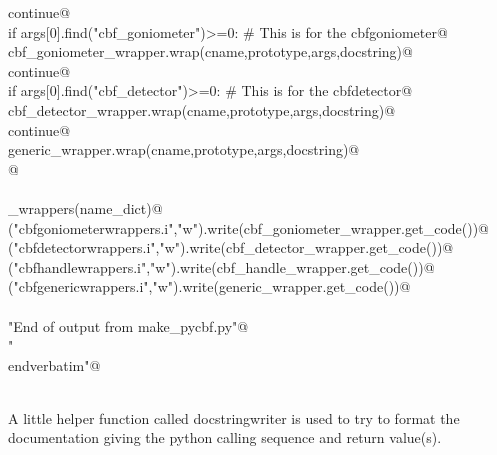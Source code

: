 \documentclass[10pt,a4paper,twoside,notitlepage]{article}
\begin{document}
\begin{flushleft}
\begin{list}{}{}
\mbox{}\verb@         continue@\\
\mbox{}\verb@      if args[0].find("cbf_goniometer")>=0: # This is for the cbfgoniometer@\\
\mbox{}\verb@         cbf_goniometer_wrapper.wrap(cname,prototype,args,docstring)@\\
\mbox{}\verb@         continue@\\
\mbox{}\verb@      if args[0].find("cbf_detector")>=0: # This is for the cbfdetector@\\
\mbox{}\verb@         cbf_detector_wrapper.wrap(cname,prototype,args,docstring)@\\
\mbox{}\verb@         continue@\\
\mbox{}\verb@      generic_wrapper.wrap(cname,prototype,args,docstring)@\\
\mbox{}\verb@ @\\
\mbox{}\verb@@\\
\mbox{}\verb@generate_wrappers(name_dict)@\\
\mbox{}\verb@open("cbfgoniometerwrappers.i","w").write(cbf_goniometer_wrapper.get_code())@\\
\mbox{}\verb@open("cbfdetectorwrappers.i","w").write(cbf_detector_wrapper.get_code())@\\
\mbox{}\verb@open("cbfhandlewrappers.i","w").write(cbf_handle_wrapper.get_code())@\\
\mbox{}\verb@open("cbfgenericwrappers.i","w").write(generic_wrapper.get_code())@\\
\mbox{}\verb@@\\
\mbox{}\verb@print "End of output from make_pycbf.py"@\\
\mbox{}\verb@print "\\end{verbatim}"@\\
\mbox{}\verb@@\\
\mbox{}\verb@@{\NWsep}
\end{list}
\vspace{-2ex}
\end{flushleft}
A little helper function called docstringwriter is used to try to 
format the documentation giving the python calling sequence and 
return value(s).
\end{document}
